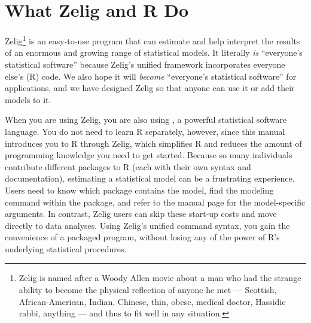 \section{What Zelig and R Do}

Zelig\footnote{Zelig is named after a Woody Allen movie about a man
  who had the strange ability to become the physical reflection of
  anyone he met --- Scottish, African-American, Indian, Chinese, thin,
  obese, medical doctor, Hassidic rabbi, anything --- and thus to fit
  well in any situation.} is an easy-to-use program that can estimate
and help interpret the results of an enormous and growing range of
statistical models.  It literally \emph{is} ``everyone's statistical
software'' because Zelig's unified framework incorporates everyone
else's (R) code.  We also hope it will \emph{become} ``everyone's
statistical software'' for applications, and we have designed Zelig so
that anyone can use it or add their models to it.

When you are using Zelig, you are also using
, a powerful statistical software
language.  You do not need to learn R separately, however, since this
manual introduces you to R through Zelig, which simplifies
R and reduces the amount of programming knowledge you need to
get started.  Because so many individuals contribute different
packages to R (each with their own syntax and documentation),
estimating a statistical model can be a frustrating experience.  Users
need to know which package contains the model, find the modeling
command within the package, and refer to the manual page for the
model-specific arguments.  In contrast, Zelig users can skip these
start-up costs and move directly to data analyses.  Using Zelig's
unified command syntax, you gain the convenience of a packaged
program, without losing any of the power of R's underlying statistical
procedures.

